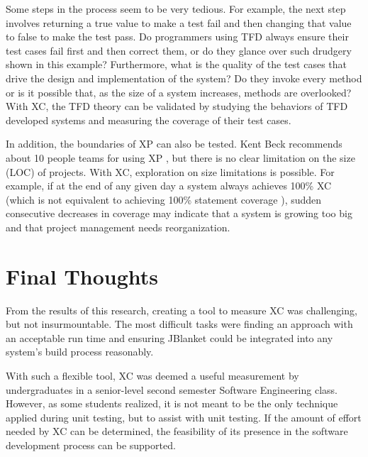 Some steps in the process seem to be very tedious.  For example, the next
step involves returning a true value to make a test fail and then changing
that value to false to make the test pass.  Do programmers using TFD always
ensure their test cases fail first and then correct them, or do they glance
over such drudgery shown in this example?  Furthermore, what is the quality
of the test cases that drive the design and implementation of the system?
Do they invoke every method or is it possible that, as the size of a system
increases, methods are overlooked?  With XC, the TFD theory can be
validated by studying the behaviors of TFD developed systems and measuring
the coverage of their test cases.

In addition, the boundaries of XP can also be tested.  Kent Beck recommends
about 10 people teams for using XP \cite{Beck:2001}, but there is no clear
limitation on the size (LOC) of projects.  With XC, exploration on size
limitations is possible.  For example, if at the end of any given day a
system always achieves 100\% XC (which is not equivalent to achieving 100\%
statement coverage \cite{Beck:2003}), sudden consecutive decreases in
coverage may indicate that a system is growing too big and that project
management needs reorganization.

\section{Final Thoughts}
From the results of this research, creating a tool to measure XC was
challenging, but not insurmountable.  The most difficult tasks were finding
an approach with an acceptable run time and ensuring JBlanket could be
integrated into any system's build process reasonably.

With such a flexible tool, XC was deemed a useful measurement by
undergraduates in a senior-level second semester Software Engineering
class.  However, as some students realized, it is not meant to be the only
technique applied during unit testing, but to assist with unit testing.  If
the amount of effort needed by XC can be determined, the feasibility of its
presence in the software development process can be supported.
